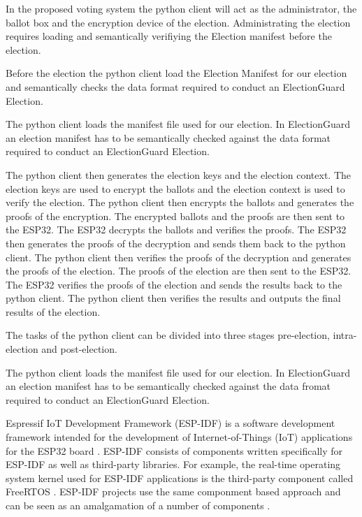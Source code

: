 In the proposed voting system the python client will act as the administrator, the ballot box and the encryption device of the election. Administrating the election requires loading and semantically verifiying the Election manifest before the election.





Before the election the python client load the Election Manifest for our election and semantically checks the data format required to conduct an ElectionGuard Election. 




The python client loads the manifest file used for our election. In ElectionGuard an election manifest has to be semantically checked against the data format required to conduct an ElectionGuard Election. 


The python client then generates the election keys and the election context. The election keys are used to encrypt the ballots and the election context is used to verify the election. The python client then encrypts the ballots and generates the proofs of the encryption. The encrypted ballots and the proofs are then sent to the ESP32. The ESP32 decrypts the ballots and verifies the proofs. The ESP32 then generates the proofs of the decryption and sends them back to the python client. The python client then verifies the proofs of the decryption and generates the proofs of the election. The proofs of the election are then sent to the ESP32. The ESP32 verifies the proofs of the election and sends the results back to the python client. The python client then verifies the results and outputs the final results of the election.

The tasks of the python client can be divided into three stages pre-election, intra-election and post-election.







The python client loads the manifest file used for our election. In ElectionGuard an election manifest has to be semantically checked against the data fromat required to conduct an ElectionGuard Election.



Espressif IoT Development Framework (ESP-IDF) is a software development framework intended for the development of Internet-of-Things (IoT) applications for the ESP32 board \cite[3]{esp-idf}. ESP-IDF consists of components written specifically for ESP-IDF as well as third-party libraries.\cite[123]{esp-idf} For example, the real-time operating system kernel used for ESP-IDF applications is the third-party component called FreeRTOS \cite[1893]{esp-idf}. ESP-IDF projects use the same componment based approach and can be seen as an amalgamation of a number of components \cite[2240]{esp-idf}.

